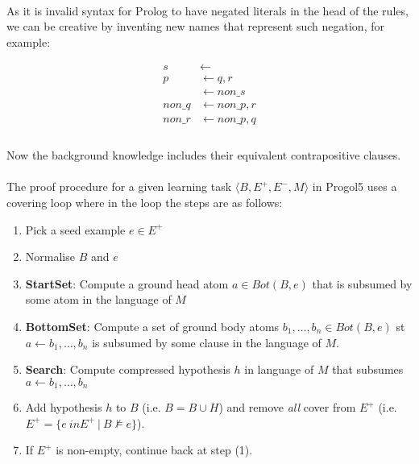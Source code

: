 \documentclass{article}
\theoremstyle{plain}
\theoremstyle{definition}
\begin{document}
\begin{multicols}{2}
\paragraph{} As it is invalid syntax for Prolog to have negated literals in the head of the rules, we can be creative by inventing new names that represent such negation, for example:

\begin{align*}
s &\leftarrow\\
p &\leftarrow q, r\\
&\leftarrow non\_s\\
non\_q &\leftarrow non\_p, r\\
non\_r &\leftarrow non\_p, q\\
\end{align*}

\paragraph{} Now the background knowledge includes their equivalent contrapositive clauses.

\paragraph{} The proof procedure for a given learning task $\langle B, E^+, E^-, M\rangle$ in Progol5 uses a covering loop where in the loop the steps are as follows:

\begin{enumerate}
\item Pick a seed example $e \in E^+$
\item Normalise $B$ and $e$
\item \textbf{StartSet}: Compute a ground head atom $a \in Bot(B, e)$ that is subsumed by some atom in the language of $M$
\item \textbf{BottomSet}: Compute a set of ground body atoms $b_1, \dots, b_n \in Bot(B, e)$ st $a \leftarrow b_1,\dots,b_n$ is subsumed by some clause in the language of $M$.
\item \textbf{Search}: Compute compressed hypothesis $h$ in language of $M$ that subsumes $a \leftarrow b_1, \dots, b_n$
\item Add hypothesis $h$ to $B$ (i.e. $B = B \cup H$) and remove \textit{all} cover from $E^+$ (i.e. $E^+ = \{e \ in E^+\ |\ B \not\models e\}$).
\item If $E^+$ is non-empty, continue back at step (1).
\end{enumerate}


\end{multicols}
\end{document}
